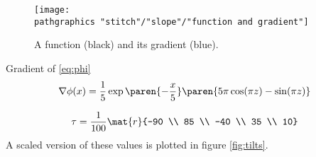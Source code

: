\begin{figure}[htbp] %
   \centering
   \texttt{[image: \\pathgraphics "stitch"/"slope"/"function and gradient"]} 
   \caption[A function and its gradient.]{A function (black) and its gradient (blue).}
   \label{fig:function and gradient}
\end{figure}

Gradient of \eqref{eq:phi}
  \begin{equation*}   %
    \nabla \phi(x) = \frac{1}{5} \exp \paren{-\frac{x}{5}} \paren{5 \pi  \cos (\pi  z)-\sin (\pi  z)}  
    \label{eq:phi}
  \end{equation*}

  \begin{equation*}   %
    \tau = \frac{1}{100}\mat{r}{-90 \\ 85 \\ -40 \\ 35 \\ 10}
  \end{equation*}
A scaled version of these values is plotted in figure \ref{fig:tilts}.

\endinput